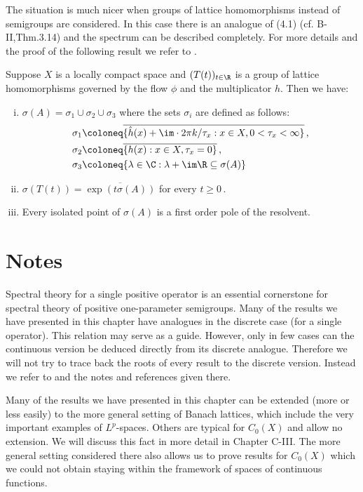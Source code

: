 The situation is much nicer when groups of lattice homomorphisms instead of semigroups are considered.
In this case there is an analogue of (4.1) (cf. B-II,Thm.3.14) and the spectrum can be described completely.
For more details and the proof of the following result we refer to \citet{arendtgreiner:1984}.
\begin{theorem}\label{thm:b3-4.11}
	Suppose $X$ is a locally compact space and $(T(t))_{t\in\R}$ is a group of lattice homomorphisms governed by the flow $\phi$ and the multiplicator $h$.
	Then we have:
	\begin{enumerate}[(i)]
		\item 
		$\sigma(A) = \sigma_{1}\cup\sigma_{2}\cup\sigma_{3}$ where the sets $\sigma_{i}$ are defined as follows:
		\[\begin{aligned}
			\sigma_{1} &\coloneq \overline{\{\hat{h}(x) + \im\cdot 2\pi k/\tau_{x} : x \in X, 0 < \tau_{x} < \infty\}}\,, \\
			\sigma_{2} &\coloneq \overline{\{h(x) : x \in X, \tau_{x} = 0\}}\,, \\
			\sigma_{3} &\coloneq \{\lambda \in \C : \lambda + \im\R \subseteq \sigma(A)\}
		\end{aligned}\]
		
		\item 
		$\sigma(T(t)) = \overline{\exp(t\sigma(A))}$ for every $t \geq 0$\,.
		
		\item 
		Every isolated point of $\sigma(A)$ is a first order pole of the resolvent.
	\end{enumerate}
\end{theorem}
\clearpage
\section*{Notes}
Spectral theory for a single positive operator is an essential cornerstone for spectral theory of positive one-parameter semigroups.
Many of the results we have presented in this chapter have analogues in the discrete case (\ie for a single operator).
This relation may serve as a guide.
However, only in few cases can the continuous version be deduced directly from its discrete analogue.
Therefore we will not try to trace back the roots of every result to the discrete version.
Instead we refer to \citet{schaefer:1974} and the notes and references given there.

Many of the results we have presented in this chapter can be extended (more or less easily) to the more general setting of Banach lattices, which include the very important examples of $L^p$-spaces.
Others are typical for $C_{0}(X)$ and allow no extension.
We will discuss this fact in more detail in Chapter C-III.
The more general setting considered there also allows us to prove results for $C_{0}(X)$ which we could not obtain staying within the framework of spaces of continuous functions.

